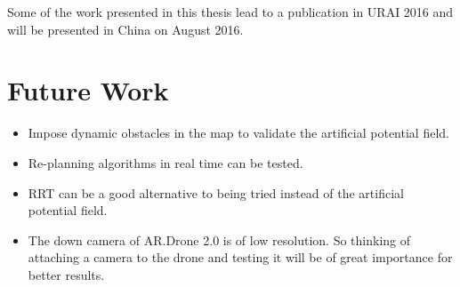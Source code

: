 Some of the work presented in this thesis lead to a publication in URAI 2016 and will be presented in China on August 2016.

\section{Future Work}
\begin{itemize}
\item Impose dynamic obstacles in the map to validate the artificial potential field. 
\item Re-planning algorithms in real time can be tested.
\item RRT can be a good alternative to being tried instead of the artificial potential field.
\item The down camera of AR.Drone 2.0 is of low resolution. So thinking of attaching a camera to the drone and testing it will be of great importance for better results.
\end{itemize}
